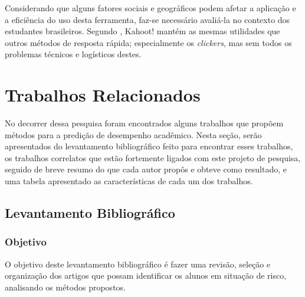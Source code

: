 \documentclass[
	12pt,				%
	openright,			%
	oneside,
	a4paper,			%
	english,			%
	french,				%
	spanish,			%
	brazil,				%
	]{abntex2}
\begin{document}
 Considerando que alguns fatores sociais e geográficos podem afetar a aplicação e a eficiência do uso desta ferramenta, faz-se necessário avaliá-la no contexto dos estudantes brasileiros. Segundo , Kahoot! mantém as mesmas utilidades que outros métodos de resposta rápida; especialmente os \textit{clickers}, mas sem todos os problemas técnicos e logísticos destes.



\chapter{Trabalhos Relacionados}
\label{sec:TR}
No decorrer dessa pesquisa foram encontrados alguns trabalhos que propõem métodos para a predição de desempenho acadêmico. Nesta seção, serão apresentados do levantamento bibliográfico feito para encontrar esses trabalhos, os trabalhos correlatos que estão fortemente ligados com este projeto de pesquisa, seguido de breve resumo do que cada autor propôs e obteve como resultado, e uma tabela apresentado as  características de cada um dos trabalhos.

\section{Levantamento Bibliográfico}
\label{sec:Lev}
\subsection{Objetivo}
\label{sec:Obj}
O objetivo deste levantamento bibliográfico é fazer uma revisão, seleção e organização dos artigos que possam identificar os alunos em situação de risco, analisando os métodos propostos.

\end{document}
